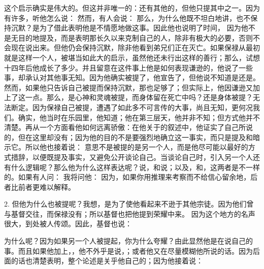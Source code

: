 这个启示确实是伟大的。但这并非唯一的：还有其他的，但他只提其中之一。因为有许多，听他怎么说： 然而，有人会说： 那么，为什么他既不坦白地讲，也不保持沉默？是为了借此表明他是不情愿地做这事。因此他也说明了时间， 因为他不是无目的地提及，而是表明那长久以来克制自己的人，除非有极大的必要，否则不会现在说出来。但他仍会保持沉默，除非他看到弟兄们正在灭亡。如果保禄从最初就是这样一个人，被堪当如此大的启示，虽然他还未行出这样的善行；那么，试想十四年后他成长了多少。并且留意在这件事上他是如何表现谦逊的，他说了一些事，却承认对其他事无知。因为他确实被提了，他宣告了，但他说不知道是还是。然而，如果他只告诉自己被提而保持沉默，那也足够了；但实际上，他因谦逊又加上了这一点。那么，是心神和灵魂被提，而身体留在死亡中吗？还是身体被提？无法断定。因为保禄自己被提，遭遇了如此多不可言传的大事，尚且无知，更何况我们。确实，他当时在乐园里，他知道；他在第三层天，他并非不知；但方式他并不清楚。再从一个方面看他如何远离骄傲：在他关于的叙述中，他证实了自己所说的，但在这里却没有；因为他的目的不是要强烈地确立这一事实，而只是提及和暗示它。所以他也接着说： 意思不是被提的是另一个人，而是他尽可能以最好的方式措辞，以便既提及事实，又避免公开谈论自己。当谈论自己时，引入另一个人还有什么逻辑呢？那么他为什么这样表达呢？说，和说；以及，和，这两者是不一样的。如果有人问： 我将问他： 因为，如果你用推理来考察而不给信心留余地，后者比前者更难以解释。\par

2. 但他为什么也被提呢？我想，是为了使他看起来不逊于其他宗徒。因为他们曾与基督交往，而保禄没有；所以基督也把他提到荣耀中来。 因为这个地方的名声很大，到处被人传颂。因此，基督也说： \par

 为什么呢？因为如果另一个人被提起，你为什么夸耀？由此显然他是在说自己的事。而且如果他加上，，他不外乎是说，；或者他又在尽量模糊他所说的话。因为后面的话也清楚表明，整个论述是关乎他自己的；因为他接着说：\par


